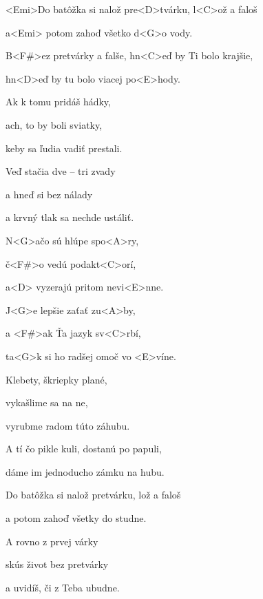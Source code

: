 

\zs
<Emi>Do batôžka si nalož pre<D>tvárku, l<C>ož a faloš 

a<Emi> potom zahoď všetko d<G>o vody. 

B<F#>ez pretvárky a falše, hn<C>eď by Ti bolo krajšie, 

hn<D>eď by tu bolo viacej po<E>hody. 
\ks

\zs
Ak k tomu pridáš hádky, 

ach, to by boli sviatky, 

keby sa ľudia vadiť prestali. 

Veď stačia dve – tri zvady 

a hneď si bez nálady 

a krvný tlak sa nechde ustáliť. 

N<G>ačo sú hlúpe spo<A>ry, 

č<F#>o vedú podakt<C>orí, 

a<D> vyzerajú pritom nevi<E>nne. 

J<G>e lepšie zaťať zu<A>by, 

a <F#>ak Ťa jazyk sv<C>rbí, 

ta<G>k si ho radšej omoč vo <E>víne. 
\ks

\zs
Klebety, škriepky plané, 

vykašlime sa na ne, 

vyrubme radom túto záhubu. 

A tí čo pikle kuli, dostanú po papuli, 

dáme im jednoducho zámku na hubu. 
\ks

\zs
Do batôžka si nalož pretvárku, lož a faloš 

a potom zahoď všetky do studne. 

A rovno z prvej várky 

skús život bez pretvárky 

a uvidíš, či z Teba ubudne. 
\ks

\kp
